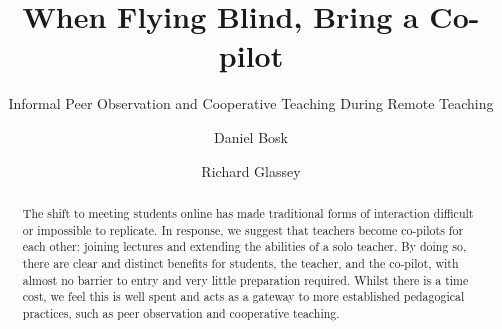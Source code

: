 \documentclass[sigconf,natbib=false]{acmart}
\begin{document}
\title{When Flying Blind, Bring a Co-pilot}
\subtitle{Informal Peer Observation and Cooperative Teaching During Remote Teaching}


\author{Daniel Bosk}
\orcid{}

\author{Richard Glassey}
\orcid{}
\fancyhead{}


\begin{abstract}

The shift to meeting students online has made traditional forms of interaction 
difficult or impossible to replicate. In response, we suggest that teachers 
become co-pilots for each other: joining lectures and extending the abilities 
of a solo teacher. By doing so, there are clear and distinct benefits for 
students, the teacher, and the co-pilot, with almost no barrier to entry and 
very little preparation required. Whilst there is a time cost, we feel this is 
well spent and acts as a gateway to more established pedagogical practices, 
such as peer observation and cooperative teaching.

\end{abstract}

\begin{CCSXML}

\end{CCSXML}
\end{document}
